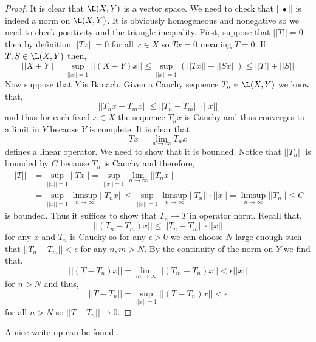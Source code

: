 \documentclass[12pt]{article}
\begin{document}
\begin{proof}
It is clear that $\L(X, Y)$ is a vector space. We need to check that $|| \bullet ||$ is indeed a norm on $\L(X, Y)$. It is obviously homogeneous and nonegative so we need to check positivity and the triangle inequality. First, suppose that $|| T || = 0$ then by definition $|| Tx || = 0$ for all $x \in X$ so $T x = 0$ meaning $T = 0$. If $T, S \in \L(X, Y)$ then,
\[ || X + Y || = \sup_{|| x || = 1} || (X + Y) x || \le \sup_{|| x || = 1 } (|| T x || + || S x ||) \le || T || + || S || \]
Now suppose that $Y$ is Banach. Given a Cauchy sequence $T_n \in \L(X, Y)$ we know that,
\[ || T_n x - T_m x || \le || T_n - T_m || \cdot || x || \]
and thus for each fixed $x \in X$ the sequence $T_n x$ is Cauchy and thus converges to a limit in $Y$ because $Y$ is complete. It is clear that
\[ T x = \lim_{n \to \infty} T_n x \]
defines a linear operator. We need to show that it is bounded. Notice that $|| T_n ||$ is bounded by $C$ because $T_n$ is Cauchy and therefore,
\begin{align*}
|| T || & = \sup_{|| x || = 1} || T x || = \sup_{|| x || = 1} \lim_{n \to \infty} || T_n x||
\\
& = \sup_{|| x || = 1} \limsup_{n \to \infty} || T_n x|| \le \sup_{|| x || = 1} \limsup_{n \to \infty} || T_n || \cdot || x || = \limsup_{n \to \infty} || T_n || \le C
\end{align*}
is bounded. Thus it suffices to show that $T_n \to T$ in operator norm. 
Recall that,
\[ || (T_n - T_m) x|| \le || T_n - T_m || \cdot || x || \]
for any $x$ and $T_n$ is Cauchy so for any $\epsilon > 0$ we can choose $N$ large enough such that $|| T_n - T_m || < \epsilon$ for any $n, m > N$.
By the continuity of the norm on $Y$ we find that,
\[ || (T - T_n) x || = \lim_{m \to \infty} || (T_m - T_n) x || < \epsilon || x || \]
for $n > N$ and thus,
\[ || T - T_n || = \sup_{|| x || = 1} || (T - T_n) x || < \epsilon \]
for all $n > N$ so $|| T - T_n || \to 0$.
\end{proof}

\begin{rmk}
A nice write up can be found .
\end{rmk}
\end{document}
